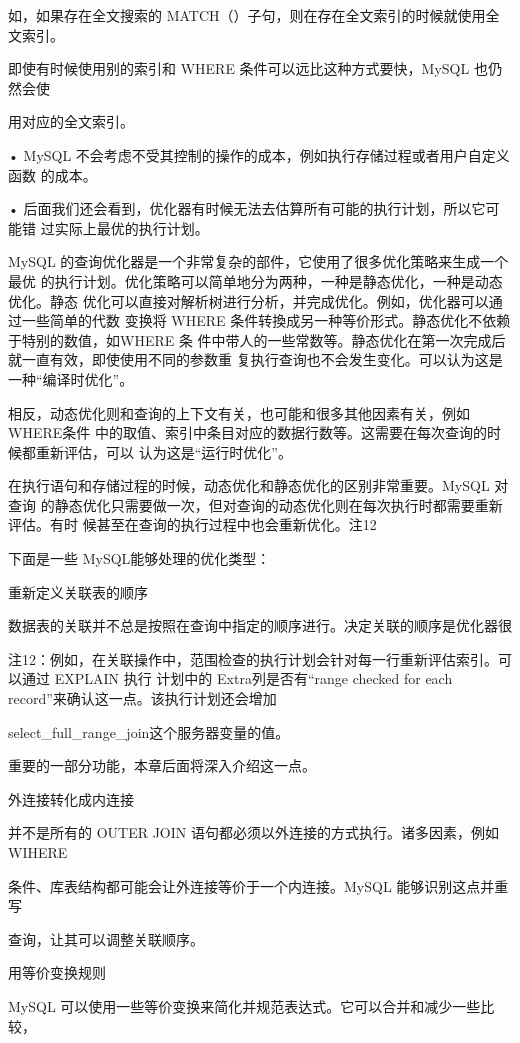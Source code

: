 如，如果存在全文搜索的 MATCH（）子句，则在存在全文索引的时候就使用全文索引。

即使有时候使用别的索引和 WHERE 条件可以远比这种方式要快，MySQL 也仍然会使

用对应的全文索引。

• MySQL 不会考虑不受其控制的操作的成本，例如执行存储过程或者用户自定义函数
的成本。

• 后面我们还会看到，优化器有时候无法去估算所有可能的执行计划，所以它可能错
过实际上最优的执行计划。

MySQL 的查询优化器是一个非常复杂的部件，它使用了很多优化策略来生成一个最优
的执行计划。优化策略可以简单地分为两种，一种是静态优化，一种是动态优化。静态
优化可以直接对解析树进行分析，并完成优化。例如，优化器可以通过一些简单的代数
变换将 WHERE 条件转換成另一种等价形式。静态优化不依赖于特别的数值，如WHERE 条
件中带人的一些常数等。静态优化在第一次完成后就一直有效，即使使用不同的参数重
复执行查询也不会发生变化。可以认为这是一种“编译时优化”。

相反，动态优化则和查询的上下文有关，也可能和很多其他因素有关，例如 WHERE条件
中的取值、索引中条目对应的数据行数等。这需要在每次查询的时候都重新评估，可以
认为这是“运行时优化”。

在执行语句和存储过程的时候，动态优化和静态优化的区别非常重要。MySQL 对查询
的静态优化只需要做一次，但对查询的动态优化则在每次执行时都需要重新评估。有时
候甚至在查询的执行过程中也会重新优化。注12

下面是一些 MySQL能够处理的优化类型：

重新定义关联表的顺序

数据表的关联并不总是按照在查询中指定的顺序进行。决定关联的顺序是优化器很

注12：例如，在关联操作中，范围检查的执行计划会针对每一行重新评估索引。可以通过 EXPLAIN 执行
计划中的 Extra列是否有“range checked for each record”来确认这一点。该执行计划还会增加

select\_full\_range\_join这个服务器变量的值。

重要的一部分功能，本章后面将深入介绍这一点。

外连接转化成内连接

并不是所有的 OUTER JOIN 语句都必须以外连接的方式执行。诸多因素，例如WIHERE

条件、库表结构都可能会让外连接等价于一个内连接。MySQL 能够识别这点并重写

查询，让其可以调整关联顺序。

用等价变换规则

MySQL 可以使用一些等价变换来简化并规范表达式。它可以合并和减少一些比较，


